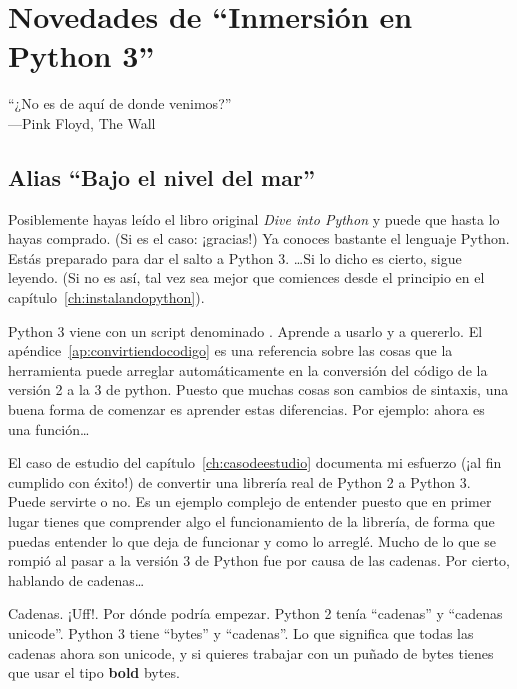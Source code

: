 
\chapter{Novedades de ``Inmersión en Python 3''}\label{ch:novedades}

\begin{citaCap}
``¿No es de aquí de donde venimos?''\\
---Pink Floyd, The Wall
\end{citaCap}

\section{Alias ``Bajo el nivel del mar''}

Posiblemente hayas leído el libro original \emph{Dive into Python} y puede que hasta lo hayas comprado. (Si es el caso: ¡gracias!) Ya conoces bastante el lenguaje Python. Estás preparado para dar el salto a Python 3. \ldots Si lo dicho es cierto, sigue leyendo. (Si no es así, tal vez sea mejor que comiences desde el principio en el capítulo~\ref{ch:instalandopython}).

Python 3 viene con un script denominado . Aprende a usarlo y a quererlo. El apéndice~\ref{ap:convirtiendocodigo} es una referencia sobre las cosas que la herramienta  puede arreglar automáticamente en la conversión del código de la versión 2 a la 3 de python. Puesto que muchas cosas son cambios de sintaxis, una buena forma de comenzar es aprender estas diferencias. Por ejemplo:  ahora es una función\ldots

El caso de estudio del capítulo~\ref{ch:casodeestudio} documenta mi esfuerzo (¡al fin cumplido con éxito!) de convertir una librería real de Python 2 a Python 3. Puede servirte o no. Es un ejemplo complejo de entender puesto que en primer lugar tienes que comprender algo el funcionamiento de la librería, de forma que puedas entender lo que deja de funcionar y como lo arreglé.  Mucho de lo que se rompió al pasar a la versión 3 de Python fue por causa de las cadenas.  Por cierto, hablando de cadenas\ldots

Cadenas. ¡Uff!. Por dónde podría empezar. Python 2 tenía ``cadenas'' y ``cadenas unicode''. Python 3 tiene ``bytes'' y ``cadenas''. Lo que significa que todas las cadenas ahora son unicode, y si quieres trabajar con un puñado de bytes tienes que usar el tipo \textbf{bold} bytes.

